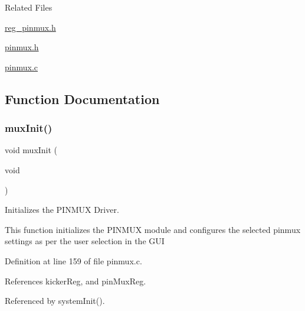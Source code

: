 Related Files
\begin{DoxyItemize}
\item \mbox{\hyperlink{reg__pinmux_8h}{reg\+\_\+pinmux.\+h}}
\item \mbox{\hyperlink{pinmux_8h}{pinmux.\+h}}
\item \mbox{\hyperlink{pinmux_8c}{pinmux.\+c}} 
\end{DoxyItemize}

\subsection{Function Documentation}
\mbox{\label{group__IOMM_ga8fac89d371c9be80b507da3c31144423}} 
\subsubsection{\texorpdfstring{mux\+Init()}{muxInit()}}
{\footnotesize\ttfamily void mux\+Init (\begin{DoxyParamCaption}\item[{void}]{ }\end{DoxyParamCaption})}



Initializes the P\+I\+N\+M\+UX Driver. 

This function initializes the P\+I\+N\+M\+UX module and configures the selected pinmux settings as per the user selection in the G\+UI 

Definition at line 159 of file pinmux.\+c.



References kicker\+Reg, and pin\+Mux\+Reg.



Referenced by system\+Init().


